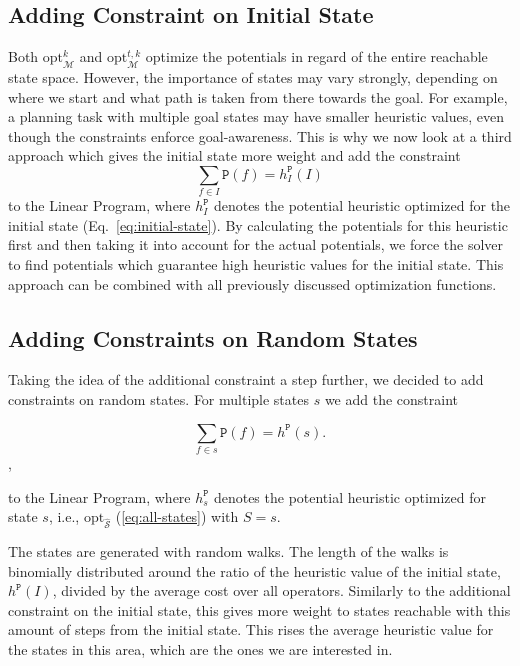 \subsection{Adding Constraint on Initial State}\label{subsec:adding-constraint-on-initial-state}
Both $\mathrm{opt}^k_\mathcal{M}$ and $\mathrm{opt}^{t,k}_\mathcal{M}$ optimize the potentials in regard of the entire reachable state space.
However, the importance of states may vary strongly, depending on where we start and what path is taken from there towards the goal.
For example, a planning task with multiple goal states may have smaller heuristic values, even though the constraints enforce goal-awareness.
This is why we now look at a third approach which gives the initial state more weight and add the constraint  \begin{equation}\sum_{f\in I}\mathtt{P}(f)=h^\mathtt{P}_I (I)\end{equation} to the Linear Program, where $h^\mathtt{P}_I$ denotes the potential heuristic optimized for the initial state (Eq.~\eqref{eq:initial-state}).
By calculating the potentials for this heuristic first and then taking it into account for the actual potentials, we force the solver to find potentials which guarantee high heuristic values for the initial state.
This approach can be combined with all previously discussed optimization functions.

\subsection{Adding Constraints on Random States}\label{subsec:adding-constraints-on-random-states}
Taking the idea of the additional constraint a step further, we decided to add constraints on random states.
For multiple states $s$ we add the constraint

\begin{equation}\sum_{f\in s}\mathtt{P}(f)=h^\mathtt{P}(s).\end{equation},

to the Linear Program, where $h^\mathtt{P}_s$ denotes the potential heuristic optimized for state $s$, i.e., $\mathrm{opt}_\mathcal{\hat{S}}$ (\eqref{eq:all-states}) with $S={s}$.

The states are generated with random walks.
The length of the walks is binomially distributed around the ratio of the heuristic value of the initial state, $h^\mathtt{P}(I)$, divided by the average cost over all operators.
Similarly to the additional constraint on the initial state, this gives more weight to states reachable with this amount of steps from the initial state.
This rises the average heuristic value for the states in this area, which are the ones we are interested in.

